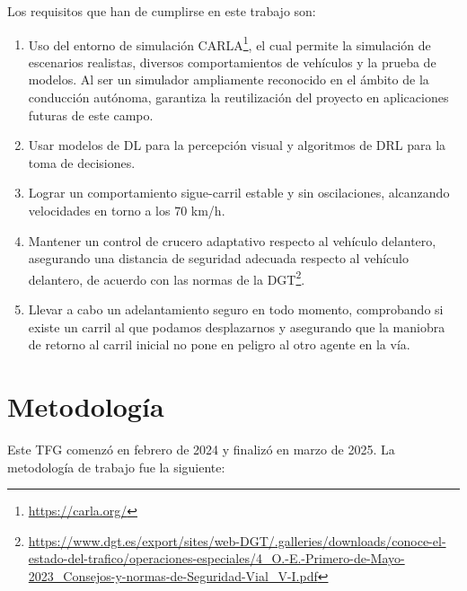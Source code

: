 Los requisitos que han de cumplirse en este trabajo son:
\begin{enumerate}
\item Uso del entorno de simulación CARLA\footnote{\url{https://carla.org/}}, el cual permite la simulación de escenarios realistas, diversos comportamientos de vehículos y la prueba de modelos. Al ser un simulador ampliamente reconocido en el ámbito de la conducción autónoma, garantiza la reutilización del proyecto en aplicaciones futuras de este campo.
\item Usar modelos de \ac{DL} para la percepción visual y algoritmos de \ac{DRL} para la toma de decisiones.
\item Lograr un comportamiento sigue-carril estable y sin oscilaciones, alcanzando velocidades en torno a los 70 km/h.
\item Mantener un control de crucero adaptativo respecto al vehículo delantero, asegurando una distancia de seguridad adecuada respecto al vehículo delantero, de acuerdo con las normas de la \ac{DGT}\footnote{\url{https://www.dgt.es/export/sites/web-DGT/.galleries/downloads/conoce-el-estado-del-trafico/operaciones-especiales/4_O.-E.-Primero-de-Mayo-2023_Consejos-y-normas-de-Seguridad-Vial_V-I.pdf}}.
\item Llevar a cabo un adelantamiento seguro en todo momento, comprobando si existe un carril al que podamos desplazarnos y asegurando que la maniobra de retorno al carril inicial no pone en peligro al otro agente en la vía.
\end{enumerate}

\section{Metodología}
\label{sec:metodologia}

Este TFG comenzó en febrero de 2024 y finalizó en marzo de 2025. La metodología de trabajo fue la siguiente:

